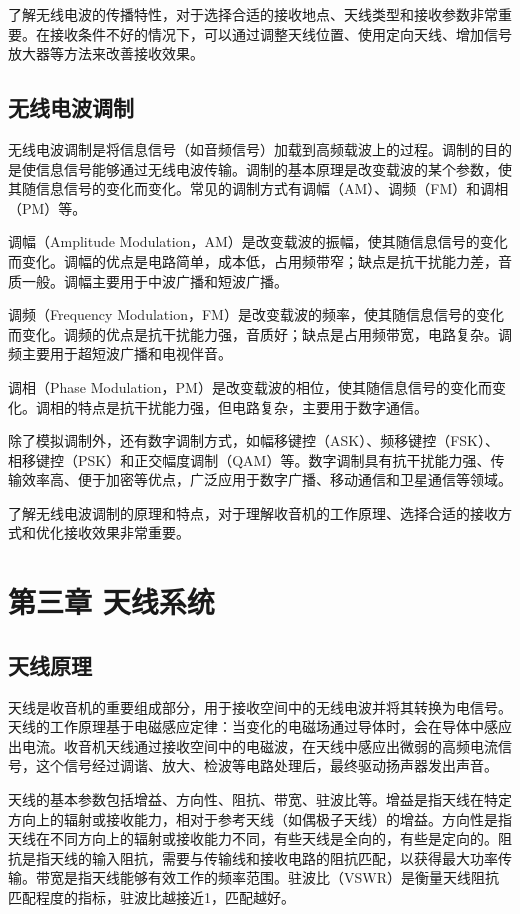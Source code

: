 \documentclass[12pt,UTF8]{ctexbook}
\begin{document}
了解无线电波的传播特性，对于选择合适的接收地点、天线类型和接收参数非常重要。在接收条件不好的情况下，可以通过调整天线位置、使用定向天线、增加信号放大器等方法来改善接收效果。

\section{无线电波调制}

无线电波调制是将信息信号（如音频信号）加载到高频载波上的过程。调制的目的是使信息信号能够通过无线电波传输。调制的基本原理是改变载波的某个参数，使其随信息信号的变化而变化。常见的调制方式有调幅（AM）、调频（FM）和调相（PM）等。

调幅（Amplitude Modulation，AM）是改变载波的振幅，使其随信息信号的变化而变化。调幅的优点是电路简单，成本低，占用频带窄；缺点是抗干扰能力差，音质一般。调幅主要用于中波广播和短波广播。

调频（Frequency Modulation，FM）是改变载波的频率，使其随信息信号的变化而变化。调频的优点是抗干扰能力强，音质好；缺点是占用频带宽，电路复杂。调频主要用于超短波广播和电视伴音。

调相（Phase Modulation，PM）是改变载波的相位，使其随信息信号的变化而变化。调相的特点是抗干扰能力强，但电路复杂，主要用于数字通信。

除了模拟调制外，还有数字调制方式，如幅移键控（ASK）、频移键控（FSK）、相移键控（PSK）和正交幅度调制（QAM）等。数字调制具有抗干扰能力强、传输效率高、便于加密等优点，广泛应用于数字广播、移动通信和卫星通信等领域。

了解无线电波调制的原理和特点，对于理解收音机的工作原理、选择合适的接收方式和优化接收效果非常重要。

\chapter{第三章 天线系统}

\section{天线原理}

天线是收音机的重要组成部分，用于接收空间中的无线电波并将其转换为电信号。天线的工作原理基于电磁感应定律：当变化的电磁场通过导体时，会在导体中感应出电流。收音机天线通过接收空间中的电磁波，在天线中感应出微弱的高频电流信号，这个信号经过调谐、放大、检波等电路处理后，最终驱动扬声器发出声音。

天线的基本参数包括增益、方向性、阻抗、带宽、驻波比等。增益是指天线在特定方向上的辐射或接收能力，相对于参考天线（如偶极子天线）的增益。方向性是指天线在不同方向上的辐射或接收能力不同，有些天线是全向的，有些是定向的。阻抗是指天线的输入阻抗，需要与传输线和接收电路的阻抗匹配，以获得最大功率传输。带宽是指天线能够有效工作的频率范围。驻波比（VSWR）是衡量天线阻抗匹配程度的指标，驻波比越接近1，匹配越好。
\end{document}
